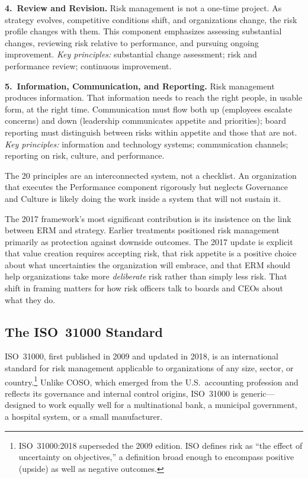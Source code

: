 \documentclass[11pt,openany]{book}
\begin{document}
\begin{regulatorynote}
\textbf{4.\ Review and Revision.}
Risk management is not a one-time project. As strategy evolves, competitive conditions shift, and organizations change, the risk profile changes with them. This component emphasizes assessing substantial changes, reviewing risk relative to performance, and pursuing ongoing improvement.
\emph{Key principles:} substantial change assessment; risk and performance review; continuous improvement.

\textbf{5.\ Information, Communication, and Reporting.}
Risk management produces information. That information needs to reach the right people, in usable form, at the right time. Communication must flow both up (employees escalate concerns) and down (leadership communicates appetite and priorities); board reporting must distinguish between risks within appetite and those that are not.
\emph{Key principles:} information and technology systems; communication channels; reporting on risk, culture, and performance.

The 20 principles are an interconnected system, not a checklist. An organization that executes the Performance component rigorously but neglects Governance and Culture is likely doing the work inside a system that will not sustain it.


\end{regulatorynote}

The 2017 framework's most significant contribution is its insistence on the link between ERM and strategy. Earlier treatments positioned risk management primarily as protection against downside outcomes. The 2017 update is explicit that value creation requires accepting risk, that risk appetite is a positive choice about what uncertainties the organization will embrace, and that ERM should help organizations take more \emph{deliberate} risk rather than simply less risk. That shift in framing matters for how risk officers talk to boards and CEOs about what they do.

\subsection{The ISO~31000 Standard}
\label{subsec:iso31000}

ISO~31000, first published in 2009 and updated in 2018, is an international standard for risk management applicable to organizations of any size, sector, or country.\footnote{ISO~31000:2018 superseded the 2009 edition. ISO defines risk as ``the effect of uncertainty on objectives,'' a definition broad enough to encompass positive (upside) as well as negative outcomes.} Unlike COSO, which emerged from the U.S.\ accounting profession and reflects its governance and internal control origins, ISO~31000 is generic---designed to work equally well for a multinational bank, a municipal government, a hospital system, or a small manufacturer.
\end{document}
